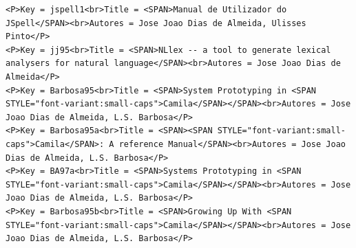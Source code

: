 \documentclass[11pt,a4paper]{report}
\begin{document}
\begin{appendices}
\begin{lstlisting}
<P>Key = jspell1<br>Title = <SPAN>Manual de Utilizador do JSpell</SPAN><br>Autores = Jose Joao Dias de Almeida, Ulisses Pinto</P>
<P>Key = jj95<br>Title = <SPAN>NLlex -- a tool to generate lexical analysers for natural language</SPAN><br>Autores = Jose Joao Dias de Almeida</P>
<P>Key = Barbosa95<br>Title = <SPAN>System Prototyping in <SPAN STYLE="font-variant:small-caps">Camila</SPAN></SPAN><br>Autores = Jose Joao Dias de Almeida, L.S. Barbosa</P>
<P>Key = Barbosa95a<br>Title = <SPAN><SPAN STYLE="font-variant:small-caps">Camila</SPAN>: A reference Manual</SPAN><br>Autores = Jose Joao Dias de Almeida, L.S. Barbosa</P>
<P>Key = BA97a<br>Title = <SPAN>Systems Prototyping in <SPAN STYLE="font-variant:small-caps">Camila</SPAN></SPAN><br>Autores = Jose Joao Dias de Almeida, L.S. Barbosa</P>
<P>Key = Barbosa95b<br>Title = <SPAN>Growing Up With <SPAN STYLE="font-variant:small-caps">Camila</SPAN></SPAN><br>Autores = Jose Joao Dias de Almeida, L.S. Barbosa</P>

\end{lstlisting}
\end{appendices}
\end{document}
